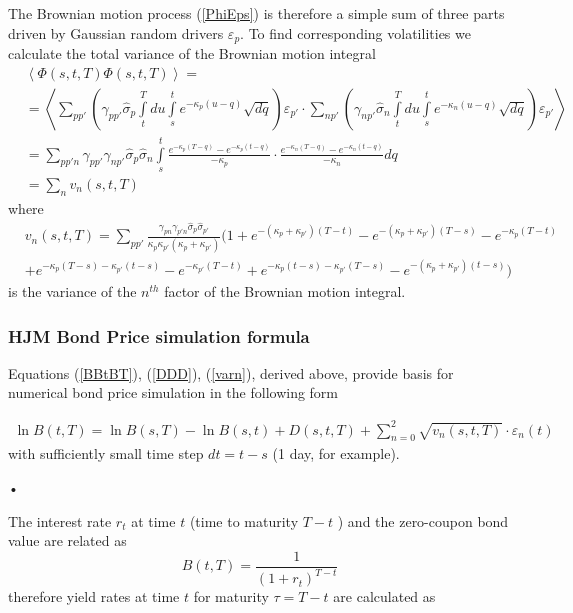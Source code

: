 \documentclass[10pt]{article}
\begin{document}
The Brownian motion process (\ref{PhiEps})  is therefore a simple sum of three parts driven by Gaussian random drivers $\varepsilon_p$. To find corresponding volatilities we calculate the total variance of  the Brownian motion integral
\begin{align}
\nonumber &\left \langle \Phi (s,t,T) \Phi (s,t,T)\right\rangle =  \\
\nonumber &= \left \langle  \sum \limits_{pp'} \left(\gamma_{pp'} \hat {\sigma}_p \int \limits_t^T du \int \limits_s^t  e^{-\kappa_p (u-q)} \sqrt{dq} \right) \varepsilon_{p'}    \cdot \sum \limits_{n p'} \left(\gamma_{n p'} \hat {\sigma}_n \int \limits_t^T du \int \limits_s^t  e^{-\kappa_n (u-q)} \sqrt{dq} \right) \varepsilon_{p'} \right\rangle \\
\nonumber &= \sum \limits_{pp'n} \gamma_{pp'} \gamma_{np'} \hat {\sigma}_p \hat {\sigma}_n\int \limits_s^t \frac{e^{-\kappa_p(T-q)}-e^{-\kappa_p(t-q)}}{-\kappa_p} \cdot  \frac{e^{-\kappa_n(T-q)}-e^{-\kappa_n(t-q)}}{-\kappa_n}dq  \\
 &=\sum \limits_{n} v_n(s,t,T) 
\end{align}
where
\begin{align}
\nonumber &v_n(s,t,T)=\sum \limits_{pp'} \frac{ \gamma_{pn} \gamma_{p'n} \hat {\sigma}_p \hat {\sigma}_{p'}}{\kappa_p \kappa_{p'} (\kappa_p + \kappa_{p'})} \Big(  1+  e^{-(\kappa_{p}+ \kappa_{p'})(T-t)}- e^{-(\kappa_{p}+ \kappa_{p'})(T-s)}  - e^{-\kappa_{p}(T-t)}  \\
\label{varn}
&+ e^{-\kappa_{p}(T-s)-\kappa_{p'}(t-s)} - e^{-\kappa_{p'}(T-t)}+ e^{-\kappa_{p}(t-s)-\kappa_{p'}(T-s)} -e^{-(\kappa_{p}+ \kappa_{p'})(t-s)} \Big) 
\end{align}
is the variance of the $n^{th}$ factor of the Brownian motion integral.

\subsubsection{HJM Bond Price simulation formula}
Equations   (\ref{BBtBT}), (\ref{DDD}), (\ref{varn}), derived above, provide basis for numerical bond price simulation in the following form

\begin{align}
\label{formulaB}
\ln B(t,T) = \ln B(s,T) - \ln B(s,t) + D(s,t,T) + \sum \limits_{n=0}^2 \sqrt{v_n(s,t,T)} \cdot \varepsilon_n (t)
\end{align}
with sufficiently small time step $dt = t - s$ (1 day, for example).
\begin{flushright}
\begin{flushright}
•
\end{flushright}
\end{flushright}
The interest rate $r_t$ at time $t$ (time to maturity $T-t$ ) and the zero-coupon bond value are related as 
\begin{equation}
\label{i_rate}
B(t,T) = \frac{1}{(1+r_t)^{T-t}}   
\end{equation}
therefore yield rates at time $t$ for maturity $\tau = T-t$ are calculated as 
\end{document}
